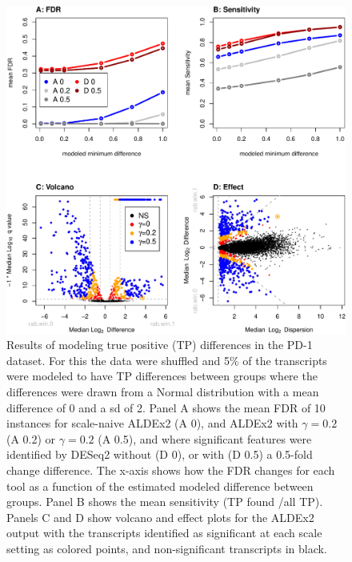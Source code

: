 \documentclass[
]{article}
\begin{document}
\begin{figure}

{\centering \includegraphics[width=0.8\linewidth]{go3_files/figure-latex/immuno-1} 

}

\caption{Results of modeling true positive (TP) differences in the PD-1 dataset. For this the data were shuffled and  5\% of the transcripts were modeled to have TP differences between groups where the differences were drawn from a Normal distribution with a mean difference of 0 and a sd of 2. Panel A shows the mean FDR of 10 instances for scale-naive ALDEx2 (A 0), and ALDEx2 with \(\gamma=0.2\) (A 0.2) or \(\gamma=0.2\) (A 0.5), and where significant features were identified by  DESeq2 without (D 0), or with (D 0.5) a 0.5-fold change difference. The x-axis shows how the FDR changes for each tool as a function of the estimated modeled difference between groups. Panel B shows the mean sensitivity (TP found /all TP). Panels C and D show volcano and effect plots for the ALDEx2 output with the transcripts identified as significant at each scale setting as colored points, and non-significant transcripts in black.}\label{fig:immuno}
\end{figure}
\end{document}
